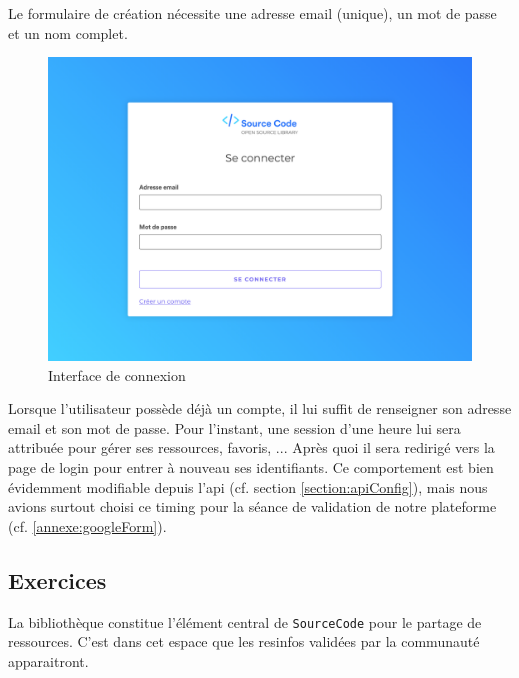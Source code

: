 Le formulaire de création nécessite une adresse email (unique), un mot de passe et un nom complet.


\begin{figure}[H]
    \includegraphics[width=\textwidth,height=0.35\textheight,keepaspectratio]{images/client/login.png}
    \centering
    \caption[SourceCode : interface de connexion]{Interface de connexion}
\end{figure}

Lorsque l'utilisateur possède déjà un compte, il lui suffit de renseigner son adresse email et son mot de passe. Pour l'instant, une session d'une heure lui sera attribuée pour gérer ses ressources, favoris, ... Après quoi il sera redirigé vers la page de login pour entrer à nouveau ses identifiants. Ce comportement est bien évidemment modifiable depuis l'api (cf. section \ref{section:apiConfig}), mais nous avions surtout choisi ce timing pour la séance de validation de notre plateforme (cf. \ref{annexe:googleForm}).\\


\subsection{Exercices}

La bibliothèque constitue l'élément central de \texttt{SourceCode} pour le partage de ressources. C'est dans cet espace que les \glspl{resinfo} validées par la communauté apparaitront.\\

